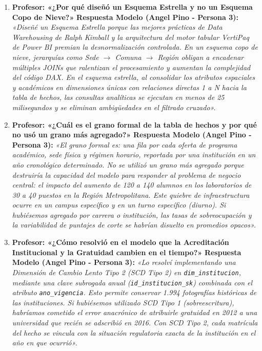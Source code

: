 \documentclass[11pt,a4paper]{article}
\begin{document}
\begin{enumerate}[leftmargin=*]
    \item \textbf{Profesor: «¿Por qué diseñó un Esquema Estrella y no un Esquema Copo de Nieve?»}
    \newline \textbf{Respuesta Modelo (Angel Pino - Persona 3):}
    \textit{«Diseñé un Esquema Estrella porque las mejores prácticas de Data Warehousing de Ralph Kimball y la arquitectura del motor tabular VertiPaq de Power BI premian la desnormalización controlada. En un esquema copo de nieve, jerarquías como Sede $\rightarrow$ Comuna $\rightarrow$ Región obligan a encadenar múltiples JOINs que ralentizan el procesamiento y aumentan la complejidad del código DAX. En el esquema estrella, al consolidar los atributos espaciales y académicos en dimensiones únicas con relaciones directas 1 a N hacia la tabla de hechos, las consultas analíticas se ejecutan en menos de 25 milisegundos y se eliminan ambigüedades en el filtrado cruzado».}

    \item \textbf{Profesor: «¿Cuál es el grano formal de la tabla de hechos y por qué no usó un grano más agregado?»}
    \newline \textbf{Respuesta Modelo (Angel Pino - Persona 3):}
    \textit{«El grano formal es: una fila por cada oferta de programa académico, sede física y régimen horario, reportada por una institución en un año cronológico determinado. No se utilizó un grano más agregado porque destruiría la capacidad del modelo para responder al problema de negocio central: el impacto del aumento de 120 a 140 alumnos en los laboratorios de 30 a 40 puestos en la Región Metropolitana. Este quiebre de infraestructura ocurre en un campus específico y en un turno específico (diurno). Si hubiésemos agregado por carrera o institución, las tasas de sobreocupación y la variabilidad de puntajes de corte se habrían disuelto en promedios opacos».}

    \item \textbf{Profesor: «¿Cómo resolvió en el modelo que la Acreditación Institucional y la Gratuidad cambien en el tiempo?»}
    \newline \textbf{Respuesta Modelo (Angel Pino - Persona 3):}
    \textit{«Lo resolví implementando una Dimensión de Cambio Lento Tipo 2 (SCD Tipo 2) en \texttt{dim\_institucion}, mediante una clave subrogada anual (\texttt{id\_institucion\_sk}) combinada con el atributo \texttt{ano\_vigencia}. Esto permite conservar 1.994 fotografías históricas de las instituciones. Si hubiésemos utilizado SCD Tipo 1 (sobreescritura), habríamos cometido el error anacrónico de atribuirle gratuidad en 2012 a una universidad que recién se adscribió en 2016. Con SCD Tipo 2, cada matrícula del hecho se vincula con la situación regulatoria exacta de la institución en el año en que ocurrió».}


\end{enumerate}
\end{document}
